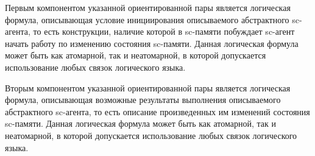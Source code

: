 \begin{SCn}
\begin{scnindent}
{    Первым компонентом указанной ориентированной пары является логическая формула, описывающая условие инициирования описываемого абстрактного sc-агента, то есть конструкции, наличие которой в sc-памяти побуждает sc-агент начать работу по изменению состояния sc-памяти. Данная логическая формула может быть как атомарной, так и неатомарной, в которой допускается использование любых связок логического языка.
    
    Вторым компонентом указанной ориентированной пары является логическая формула, описывающая возможные результаты выполнения описываемого абстрактного sc-агента, то есть описание произведенных им изменений состояния sc-памяти. Данная логическая формула может быть как атомарной, так и неатомарной, в которой допускается использование любых связок логического языка.}
\end{scnindent}
\begin{scnindent}
\end{scnindent}


\end{SCn}
